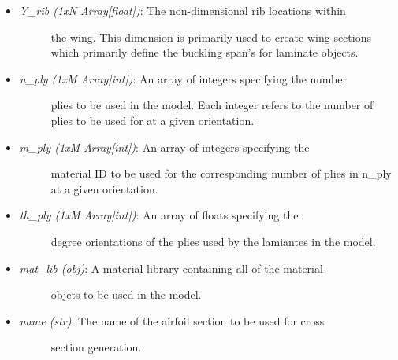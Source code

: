 \documentclass[letterpaper,10pt,english]{sphinxmanual}
\begin{document}
\begin{fulllineitems}
\begin{fulllineitems}
\begin{itemize}
\begin{description}
\end{description}

\item {} \begin{description}
\item[{\emph{Y\_rib (1xN Array{[}float{]})}: The non-dimensional rib locations within}] \leavevmode
the wing. This dimension is primarily used to create wing-sections
which primarily define the buckling span's for laminate objects.

\end{description}

\item {} \begin{description}
\item[{\emph{n\_ply (1xM Array{[}int{]})}: An array of integers specifying the number}] \leavevmode
plies to be used in the model. Each integer refers to the number of
plies to be used for at a given orientation.

\end{description}

\item {} \begin{description}
\item[{\emph{m\_ply (1xM Array{[}int{]})}: An array of integers specifying the}] \leavevmode
material ID to be used for the corresponding number of plies in
n\_ply at a given orientation.

\end{description}

\item {} \begin{description}
\item[{\emph{th\_ply (1xM Array{[}int{]})}: An array of floats specifying the}] \leavevmode
degree orientations of the plies used by the lamiantes in the
model.

\end{description}

\item {} \begin{description}
\item[{\emph{mat\_lib (obj)}: A material library containing all of the material}] \leavevmode
objets to be used in the model.

\end{description}

\item {} \begin{description}
\item[{\emph{name (str)}: The name of the airfoil section to be used for cross}] \leavevmode
section generation.


\end{description}
\end{itemize}
\end{fulllineitems}
\end{fulllineitems}
\end{document}
